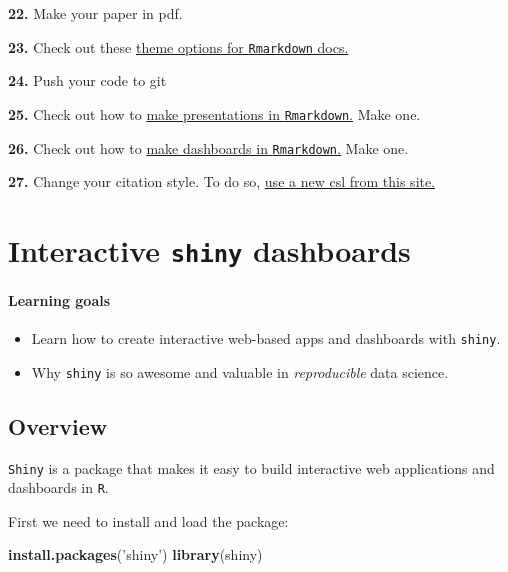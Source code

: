 \documentclass[]{book}
\newenvironment{Shaded}{\begin{snugshade}}{\end{snugshade}}
\newcommand{\KeywordTok}[1]{\textcolor[rgb]{0.13,0.29,0.53}{\textbf{#1}}}
\newcommand{\NormalTok}[1]{#1}
\newcommand{\StringTok}[1]{\textcolor[rgb]{0.31,0.60,0.02}{#1}}
\begin{document}
\textbf{22.} Make your paper in pdf.

\textbf{23.} Check out these \href{https://www.datadreaming.org/post/r-markdown-theme-gallery/}{theme options for \texttt{Rmarkdown} docs.}

\textbf{24.} Push your code to git

\textbf{25.} Check out how to \href{https://rmarkdown.rstudio.com/lesson-11.html}{make presentations in \texttt{Rmarkdown}.} Make one.

\textbf{26.} Check out how to \href{https://rmarkdown.rstudio.com/lesson-12.html}{make dashboards in \texttt{Rmarkdown}.} Make one.

\textbf{27.} Change your citation style. To do so, \href{https://github.com/citation-style-language/styles}{use a new csl from this site.}

\hypertarget{shiny}{%
\chapter{\texorpdfstring{Interactive \texttt{shiny} dashboards}{Interactive shiny dashboards}}\label{shiny}}

\hypertarget{learning-goals-16}{%
\subsubsection*{Learning goals}\label{learning-goals-16}}

\begin{itemize}
\item
  Learn how to create interactive web-based apps and dashboards with \texttt{shiny}.
\item
  Why \texttt{shiny} is so awesome and valuable in \emph{reproducible} data science.
\end{itemize}

\hypertarget{overview}{%
\section*{Overview}\label{overview}}

\texttt{Shiny} is a package that makes it easy to build interactive web applications and dashboards in \texttt{R}.

First we need to install and load the package:

\begin{Shaded}
\begin{Highlighting}[]
\KeywordTok{install.packages}\NormalTok{(}\StringTok{'shiny'}\NormalTok{)}
\KeywordTok{library}\NormalTok{(shiny)}
\end{Highlighting}
\end{Shaded}
\end{document}
